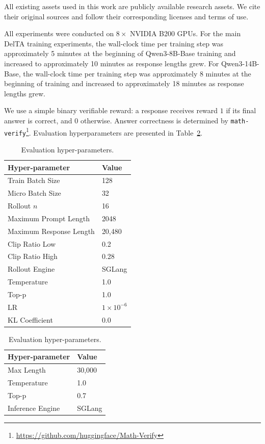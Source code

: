 \documentclass{article} %
\begin{document}
All existing assets used in this work are publicly available research assets. We cite their original sources and follow their corresponding licenses and terms of use.


All experiments were conducted on \(8\times\) NVIDIA B200 GPUs. 
For the main DelTA training experiments, the wall-clock time per training step was approximately 5 minutes at the beginning of Qwen3-8B-Base training and increased to approximately 10 minutes as response lengths grew.
For Qwen3-14B-Base, the wall-clock time per training step was approximately 8 minutes at the beginning of training and increased to approximately 18 minutes as response lengths grew.



We use a simple binary verifiable reward: a response receives reward \(1\) if its final answer is correct, and \(0\) otherwise. Answer correctness is determined by \texttt{math-verify}\footnote{\url{https://github.com/huggingface/Math-Verify}}. Evaluation hyperparameters are presented in Table~\ref{tab:eval-hyperparameters}.
\begin{table}[t]  
\begin{center}
\begin{minipage}[t]{0.48\linewidth}
\caption{Training settings.}
\label{tab:RL-hyper-parameters}
\centering
\begin{tabular}{ll}
\toprule
Hyper-parameter & Value \\
\midrule
Train Batch Size & 128  \\
Micro Batch Size & 32 \\
Rollout $n$ & 16 \\
Maximum Prompt Length & 2048 \\
Maximum Response Length & 20,480 \\
Clip Ratio Low & 0.2 \\
Clip Ratio High & 0.28 \\
Rollout Engine & SGLang \\
Temperature & 1.0 \\
Top-p & 1.0 \\
LR & $1\times 10^{-6}$ \\
KL Coefficient & 0.0 \\
\bottomrule
\end{tabular}
\end{minipage}  
\hfil
\begin{minipage}[t]{0.48\linewidth}

\caption{Evaluation hyper-parameters.}
\label{tab:eval-hyperparameters}
\centering
\begin{tabular}{ll}
\toprule
Hyper-parameter & Value \\
\midrule
Max Length & 30,000  \\
Temperature & 1.0 \\
Top-p & 0.7 \\
Inference Engine & SGLang \\
\bottomrule
\end{tabular}
\end{minipage} 
\end{center}
\end{table}
\end{document}

